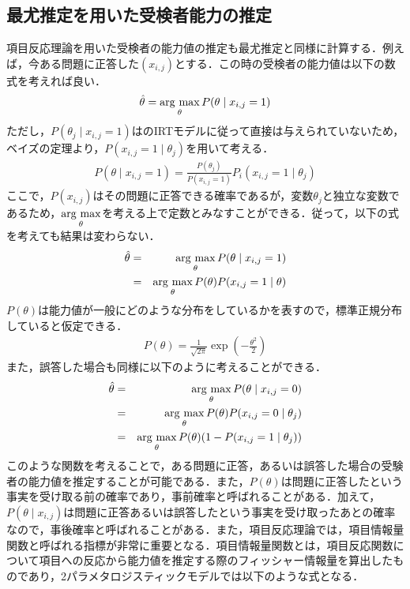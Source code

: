 \documentclass[12pt]{jarticle}
\begin{document}
\subsection{最尤推定を用いた受検者能力の推定}
項目反応理論を用いた受検者の能力値の推定も最尤推定と同様に計算する．例えば，今ある問題に正答した$(x_{i,j})$とする．この時の受検者の能力値は以下の数式を考えれば良い．
\begin{equation}
    \hat{\theta} = \mathop{\rm arg~max}\limits_{\theta} P(\theta \mid x_{i,j}=1)
\end{equation}
ただし，$P(\theta_j \mid x_{i,j}=1)$はのIRTモデルに従って直接は与えられていないため，ベイズの定理より，$P(x_{i,j}=1 \mid \theta_j)$を用いて考える．
\begin{eqnarray}
    P(\theta \mid x_{i,j}=1)=\frac{P(\theta_j)}{P(x_{i,j}=1)}P_i(x_{i,j}=1 \mid \theta_j)
\end{eqnarray}
ここで，$P(x_{i,j})$はその問題に正答できる確率であるが，変数$\theta_j$と独立な変数であるため，$\mathop{\rm arg~max}\limits_{\theta}$を考える上で定数とみなすことができる．従って，以下の式を考えても結果は変わらない．
\begin{eqnarray}
    \hat{\theta} &=& \mathop{\rm arg~max}\limits_{\theta} P(\theta \mid x_{i,j}=1) \\
    &=& \mathop{\rm arg~max}\limits_{\theta}P(\theta) P(x_{i,j}=1\mid\theta)
\end{eqnarray}
$P(\theta)$は能力値が一般にどのような分布をしているかを表すので，標準正規分布していると仮定できる．
\begin{eqnarray}
    P(\theta)=\frac{1}{\sqrt{2\pi}}\exp \left(-\frac{\theta ^2}{2}\right)
\end{eqnarray}
また，誤答した場合も同様に以下のように考えることができる．
\begin{eqnarray}
    \hat{\theta} &=& \mathop{\rm arg~max}\limits_{\theta} P(\theta \mid x_{i,j}=0)\\
    &=& \mathop{\rm arg~max}\limits_{\theta}P(\theta) P(x_{i,j}=0\mid\theta_j)\\
    &=& \mathop{\rm arg~max}\limits_{\theta}P(\theta)(1- P(x_{i,j}=1\mid\theta_j))
\end{eqnarray}
このような関数を考えることで，ある問題に正答，あるいは誤答した場合の受験者の能力値を推定することが可能である．また，$P(\theta)$は問題に正答したという事実を受け取る前の確率であり，事前確率と呼ばれることがある．加えて，$P(\theta \mid x_{i,j})$は問題に正答あるいは誤答したという事実を受け取ったあとの確率なので，事後確率と呼ばれることがある．また，項目反応理論では，項目情報量関数と呼ばれる指標が非常に重要となる．項目情報量関数とは，項目反応関数について項目への反応から能力値を推定する際のフィッシャー情報量を算出したものであり，2パラメタロジスティックモデルでは以下のような式となる．
\end{document}
